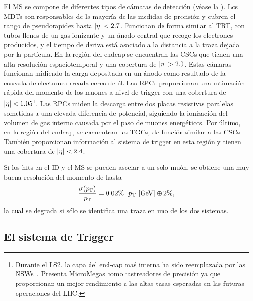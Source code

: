 El \ac{MS} se compone de diferentes tipos de cámaras de detección (véase la \Fig{\ref{fig:atlas:atlas:muon_spectrometer:muon_spectrometer}}). Los \acp{MDT} son responsables de la mayoría de las medidas de precisión y cubren el rango de pseudorapidez hasta \(|\eta|<2.7\). Funcionan de forma similar al \ac{TRT}, con tubos llenos de un gas ionizante y un ánodo central que recoge los electrones producidos, y el tiempo de deriva está asociado a la distancia a la traza dejada por la partícula. En la región del endcap se encuentran las \acp{CSC} que tienen una alta resolución espaciotemporal y una cobertura de \(\abseta>2.0\). Estas cámaras funcionan midiendo la carga depositada en un ánodo como resultado de la cascada de electrones creada cerca de él. Las \acp{RPC} proporcionan una estimación rápida del momento de los muones a nivel de trigger con una cobertura de \(|\eta|<1.05\)\footnote{Durante el \ac{LS2}, la capa del end-cap ma\'s interna ha sido reemplazada por las \acp{NSW}~\cite{ATLAS-NSW}. Presenta MicroMegas como rastreadores de precisión ya que proporcionan un mejor rendimiento a las altas tasas esperadas en las futuras operaciones del LHC.}. Las \acp{RPC} miden la descarga entre dos placas resistivas paralelas sometidas a una elevada diferencia de potencial, siguiendo la ionización del volumen de gas interno causada por el paso de muones energéticos. Por último, en la región del endcap, se encuentran los \acp{TGC}, de función similar a los \acp{CSC}. También proporcionan información al sistema de trigger en esta región y tienen una cobertura de \(|\eta|<2.4\).

Si los hits en el \ac{ID} y el \ac{MS} se pueden asociar a un solo muón, se obtiene una muy buena resolución del momento de hasta
\begin{equation}
    \frac{\sigma(p_{\text{T}})}{p_{\text{T}}} = 
    0.02\% \cdot p_{\text{T}}~[\text{GeV}] \oplus 2\%,
\end{equation}
la cual se degrada si sólo se identifica una traza en uno de los dos sistemas.






\subsection{El sistema de Trigger}



